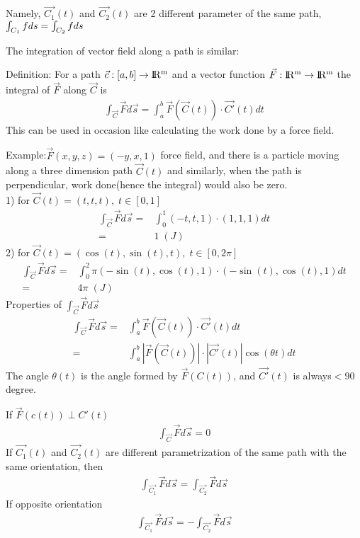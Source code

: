 \documentclass{article}
\newcommand{\R}{\rm I\!R}
\begin{document}
        Namely, $\vec{C_1}(t)$ and $\vec{C_2}(t)$ are 2 different parameter of the same path, $\int_{C_1} fds = \int_{C_2} fds\\$
        
        The integration of vector field along a path is similar:
        
        Definition: For a path $\vec{c}:[a,b]\rightarrow \R^m$ and a vector function $\vec{F}:\R^m\rightarrow\R^m$ the integral of $\vec{F}$ along $\vec{C}$ is
        \begin{align}
            \int_{\vec{C}}\vec{F}d\vec{s} = \int_a^b \vec{F}(\vec{C}(t))\cdot\vec{C'}(t)dt
        \end{align}
        This can be used in occasion like calculating the work done by a force field.
        
        Example:$\vec{F}(x,y,z) = (-y,x,1)$ force field, and there is a particle moving along a three dimension path $\vec{C}(t)$ and similarly, when the path is perpendicular, work done(hence the integral) would also be zero.\\
        
        1) for $\vec{C}(t) = (t,t,t),\;t\in[0,1]$
        \begin{align}
            \int_{\vec{C}}\vec{F}d\vec{s} =& \int_0^1(-t,t,1)\cdot(1,1,1)dt\\
            =&1\;(J)
        \end{align}
        2) for $\vec{C}(t) = (\cos(t),\sin(t),t),\;t\in[0,2\pi]$
        \begin{align}
            \int_{\vec{C}}\vec{F}d\vec{s} =& \int_0^2\pi(-\sin(t),\cos(t),1)\cdot(-\sin(t),\cos(t),1)dt\\
            =&4\pi\;(J)
        \end{align}
        Properties of $\int_{\vec{C}}\vec{F}d\vec{s}$
        \begin{align}
            \int_{\vec{C}}\vec{F}d\vec{s} =& \int_a^b \vec{F}(\vec{C}(t))\cdot\vec{C'}(t)dt\\
            =& \int_a^b |\vec{F}(\vec{C}(t))|\cdot|\vec{C'}(t)|\cos(\theta t)dt
        \end{align}
        The angle $\theta(t)$ is the angle formed by $\vec{F}(C(t))$, and $\vec{C'}(t)$ is always$< 90$ degree.
        
        If $\vec{F}(c(t)) \perp C'(t)$
        \begin{align}
             \int_{\vec{C}}\vec{F}d\vec{s} = 0
        \end{align}
        If $\vec{C_1}(t)$ and $\vec{C_2}(t)$ are different parametrization of the same path with the same orientation, then
        \begin{align}
            \int_{\vec{C_1}}\vec{F}d\vec{s} = \int_{\vec{C_2}}\vec{F}d\vec{s}
        \end{align}
        If opposite orientation
        \begin{align}
            \int_{\vec{C_1}}\vec{F}d\vec{s} = -\int_{\vec{C_2}}\vec{F}d\vec{s}
        \end{align}
        
\end{document}
